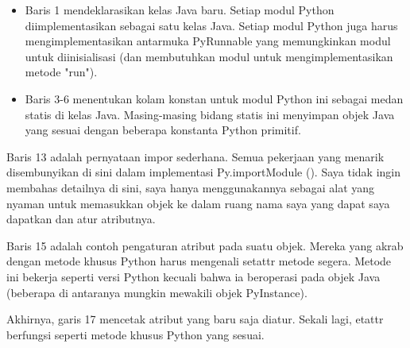 \documentclass[12pt,a4paper]{article}
\begin{document}
\begin{itemize}
\begin{itemize}

\item Baris 1 mendeklarasikan kelas Java baru. Setiap modul Python diimplementasikan sebagai satu kelas Java. Setiap modul Python juga harus mengimplementasikan antarmuka PyRunnable yang memungkinkan modul untuk diinisialisasi (dan membutuhkan modul untuk mengimplementasikan metode "run"). 
\item Baris 3-6 menentukan kolam konstan untuk modul Python ini sebagai medan statis di kelas Java. Masing-masing bidang statis ini menyimpan objek Java yang sesuai dengan beberapa konstanta Python primitif.

\end{itemize}

\end{itemize}

Baris 13 adalah pernyataan impor sederhana. Semua pekerjaan yang menarik disembunyikan di sini dalam implementasi Py.importModule (). Saya tidak ingin membahas detailnya di sini, saya hanya menggunakannya sebagai alat yang nyaman untuk memasukkan objek ke dalam ruang nama saya yang dapat saya dapatkan dan atur atributnya.

Baris 15 adalah contoh pengaturan atribut pada suatu objek. Mereka yang akrab dengan metode khusus Python harus mengenali setattr metode segera. Metode ini bekerja seperti versi Python kecuali bahwa ia beroperasi pada objek Java (beberapa di antaranya mungkin mewakili objek PyInstance). 

Akhirnya, garis 17 mencetak atribut yang baru saja diatur. Sekali lagi, etattr berfungsi seperti metode khusus Python yang sesuai.\\
\end{document}
